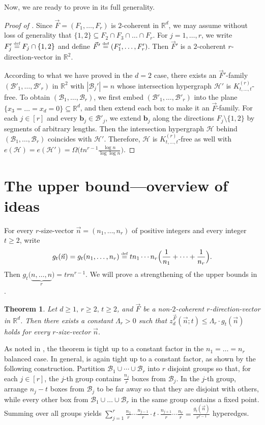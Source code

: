 \documentclass[11pt]{article}
\newtheorem{theorem}{Theorem}[section]
\theoremstyle{definition}
\newcommand*{\eqdef}{\stackrel{\mbox{\normalfont\tiny def}}{=}} %
\newcommand*{\R}{\mathbb{R}}                                    %
\newcommand*{\cH}{\mathcal{H}}
\newcommand*{\vF}{\vec{F}}
\newcommand*{\cB}{\mathcal{B}}
\newcommand*{\vn}{\vec{n}}
\begin{document}
Now, we are ready to prove  in its full generality. 

\begin{proof}[Proof of ]
    Since $\vF = (F_1, \dots, F_r)$ is $2$-coherent in $\R^d$, we may assume without loss of generality that $\{1, 2\} \subseteq F_2 \cap F_3 \cap \dots \cap F_r$. For $j = 1, \dots, r$, we write $F_j' \eqdef F_j \cap \{1, 2\}$ and define $\vF' \eqdef (F_1', \dots, F_r')$. Then $\vF'$ is a $2$-coherent $r$-direction-vector in $\R^2$. 
    
    According to what we have proved in the $d = 2$ case, there exists an $\vF'$-family $(\cB'_1, \dots, \cB'_r)$ in $\R^2$ with $|\cB_j'| = n$ whose intersection hypergraph $\cH'$ is $K_{t, \dots, t}^{(r)}$-free. To obtain $(\cB_1, \dots, \cB_r)$, we first embed $(\cB'_1, \dots, \cB'_r)$ into the plane $\{x_3 = \dots = x_d = 0\} \subseteq \R^d$, and then extend each box to make it an $\vF$-family. For each $j \in [r]$ and every $\bm{b}_j \in \cB'_j$, we extend $\bm{b}_j$ along the directions $F_j \setminus \{1, 2\}$ by segments of arbitrary lengths. Then the intersection hypergraph $\cH$ behind $(\cB_1, \dots, \cB_r)$ coincides with $\cH'$. Therefore, $\cH$ is $K_{t, \dots, t}^{(r)}$-free as well with $e(\cH) = e(\cH') = \Omega \bigl( tn^{r-1} \frac{\log n}{\log\log n} \bigr)$. 
\end{proof}

\section{The upper bound---overview of ideas} \label{sec:upper_sketch}

For every $r$-size-vector $\vn = (n_1, \dots, n_r)$ of positive integers and every integer $t \ge 2$, write 
\[
g_t(\vn) = g_t(n_1, \dots, n_r) \eqdef t n_1 \cdots n_r \Bigl( \frac{1}{n_1} + \dots + \frac{1}{n_r} \Bigr). 
\]
Then $g_t\bigl( \underbrace{n, \dots, n}_r \bigr) = tr n^{r-1}$. 
We will prove a strengthening of the upper bounds in .

\begin{theorem} \label{thm:upper_general}
    Let $d \ge 1, \, r \ge 2, \, t \ge 2$, and $\vF$ be a non-$2$-coherent $r$-direction-vector in $\R^d$. Then there exists a constant $\Lambda_r > 0$ such that $z_d^{\vF}(\vn; t) \le \Lambda_r \cdot g_t(\vn)$ holds for every $r$-size-vector $\vn$. 
\end{theorem}

As noted in , the theorem is tight up to a constant factor in the $n_1 = \dots = n_r$ balanced case. In general,  is again tight up to a constant factor, as shown by the following construction. 
Partition $\cB_1 \cup \cdots \cup \cB_r$ into $r$ disjoint groups so that, for each $j \in [r]$, the $j$-th group contains $\frac{n_j}{r}$ boxes from $\cB_j$. In the $j$-th group, arrange $n_j - t$ boxes from $\cB_j$ to be far away so that they are disjoint with others, while every other box from $\cB_1 \cup \dots \cup \cB_r$ in the same group contains a fixed point. Summing over all groups yields $\sum_{j=1}^ r\frac{n_1}{r} \cdots \frac{n_{j-1}}{r} \cdot t \cdot \frac{n_{j+1}}{r} \cdots \frac{n_r}{r} = \frac{g_t(\vn)}{r^{r-1}}$ hyperedges.
\end{document}
